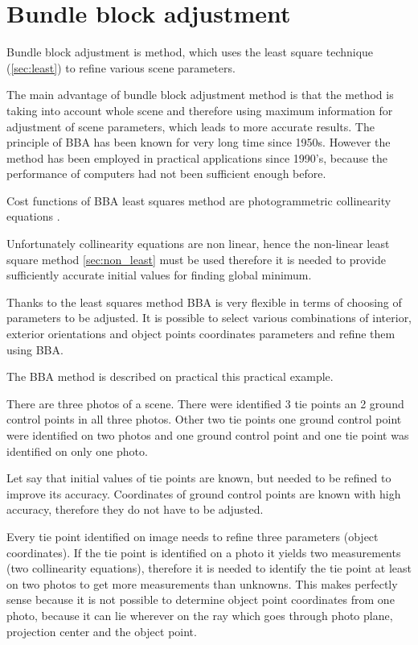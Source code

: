 \documentclass[a4paper,12pt]{report}
\begin{document}
\section{Bundle block adjustment}

Bundle block adjustment is method, which uses the least square technique (\ref{sec:least}) to refine  various scene parameters. 

The main advantage of bundle block adjustment method is that the method is taking into account whole scene and therefore using 
maximum information for adjustment of scene parameters, which leads to more accurate results.
The principle of BBA has been known for very long time since 1950s.
However the method has been employed in practical applications since 1990's, because the performance of computers had not been 
sufficient enough before. 

Cost functions of BBA least squares method are photogrammetric collinearity equations \label{eq:p_abbr}.

Unfortunately collinearity equations are non linear, hence the non-linear least square method \ref{sec:non_least} must be used therefore 
it is needed to provide sufficiently accurate initial values for finding global minimum.

Thanks to the least squares method BBA is very flexible in terms of choosing of parameters to be adjusted. 
It is possible to select various combinations of interior, exterior orientations and object points coordinates parameters 
and refine them using BBA. 


The BBA method is described on practical this practical example.


There are three photos of a scene.
There were identified 3 tie points an 2 ground control points in all three photos.
Other two tie points one ground control point were identified on two photos and one ground control point and one tie point was identified 
on only one photo. 

Let say that initial values of tie points are known, but needed to be refined to improve its accuracy.
Coordinates of ground control points are known with high accuracy, therefore they do not have to be adjusted. 

Every tie point identified on image needs to refine three parameters (object coordinates). 
If the tie point is identified on a photo it yields two measurements (two collinearity equations), 
therefore it is needed to identify the tie point at least on two photos to get more measurements 
than unknowns. This makes perfectly sense because it is not possible to determine object point coordinates from one photo,
because it can lie wherever on the ray  which goes through photo plane, projection center and the object point.
\end{document}
